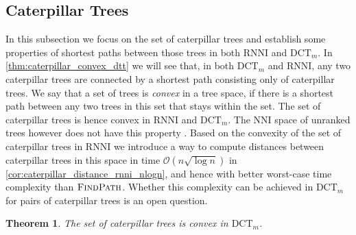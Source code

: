 \documentclass[11pt]{amsart}
\newtheorem{theorem}{Theorem}
\newcommand{\rnni}{\mathrm{RNNI}}
\newcommand{\findpath}{\textsc{FindPath}}
\newcommand{\nni}{\mathrm{NNI}}
\newcommand{\dct}{\mathrm{DCT}}
\renewcommand{\O}{\mathcal O}
\newcommand{\summary}[1]{} %
\begin{document}
\subsection{Caterpillar Trees}
\label{section:caterpillar_convex}

\summary{Defining Caterpillar trees.
Why are they interesting?}
In this subsection we focus on the set of caterpillar trees and establish some properties of shortest paths between those trees in both $\rnni$ and $\dct_m$.
In \autoref{thm:caterpillar_convex_dtt} we will see that, in both $\dct_m$ and $\rnni$, any two caterpillar trees are connected by a shortest path consisting only of caterpillar trees.
We say that a set of trees is \emph{convex} in a tree space, if there is a shortest path between any two trees in this set that stays within the set.
The set of caterpillar trees is hence convex in $\rnni$ and $\dct_m$.
The $\nni$ space of unranked trees however does not have this property \autocite{Gavryushkin2018-ol}.
Based on the convexity of the set of caterpillar trees in $\rnni$ we introduce a way to compute distances between caterpillar trees in this space in time $\O(n \sqrt{\log n})$ in \autoref{cor:caterpillar_distance_rnni_nlogn}, and hence with better worst-case time complexity than $\findpath$.
Whether this complexity can be achieved in $\dct_m$ for pairs of caterpillar trees is an open question.

\begin{theorem}
	The set of caterpillar trees is convex in $\dct_m$.
	\label{thm:caterpillar_convex_dtt}
\end{theorem}
\end{document}
